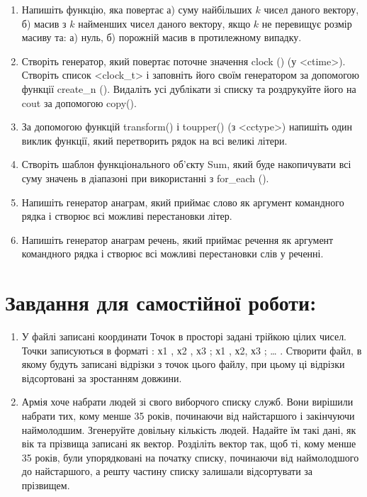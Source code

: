 \documentclass[a5paper,titlepage,openany,twoside,
]
{book_unv}%
\begin{document}
\begin{enumerate}
\begin{enumerate}
\begin{enumerate}
\item
  Напишіть функцію, яка повертає а) суму найбільших $k$ чисел даного
  вектору, б) масив з $k$ найменших чисел даного вектору, якщо $k$ не
  перевищує розмір масиву та: а) нуль, б) порожній масив в протилежному
  випадку.
\item
  Створіть генератор, який повертає поточне значення clock () (у
  \textless{}ctime\textgreater{}). Створіть список
  \textless{}clock\_t\textgreater{} і заповніть його своїм генератором
  за допомогою функції create\_n (). Видаліть усі дублікати зі списку та
  роздрукуйте його на cout за допомогою copy().
\item
  За допомогою функцій transform() і toupper() (з
  \textless{}cctype\textgreater{}) напишіть один виклик функції, який
  перетворить рядок на всі великі літери.
\item
  Створіть шаблон функціонального об'єкту Sum, який буде накопичувати всі
  суму значень в діапазоні при використанні з for\_each ().
\item
  Напишіть генератор анаграм, який приймає слово як аргумент командного
  рядка і створює всі можливі перестановки літер.
\item
  Напишіть генератор анаграм речень, який приймає речення як аргумент
  командного рядка і створює всі можливі перестановки слів у реченні.
\end{enumerate}

\section{Завдання для самостійної роботи:}

\begin{enumerate}
\def\labelenumi{\arabic{enumi})}
\setcounter{enumi}{8}
\item
  У файлі записані координати Точок в просторі задані трійкою цілих
  чисел. Точки записуються в форматі : х1 , х2 , х3 ; х1 , х2, х3 ;
  \ldots{} . Створити файл, в якому будуть записані відрізки з точок цього файлу, при
цьому ці відрізки відсортовані за зростанням довжини.

\item
  Армія хоче набрати людей зі свого виборчого списку служб. Вони
  вирішили набрати тих, кому менше 35 років, починаючи
  від найстаршого і закінчуючи наймолодшим. Згенеруйте довільну кількість
  людей. Надайте їм такі дані, як вік та прізвища записані як вектор.
  Розділіть вектор так, щоб ті, кому менше 35 років, були
  упорядковані на початку списку, починаючи від наймолодшого до
  найстаршого, а решту частину списку залишали відсортувати за прізвищем.


\end{enumerate}
\end{enumerate}
\end{enumerate}
\end{document}
